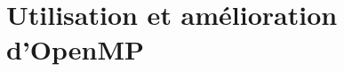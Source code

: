 

\chapter{Utilisation et amélioration d'OpenMP}\label{chap:contrib:openmp}
\chaptertoc


%










